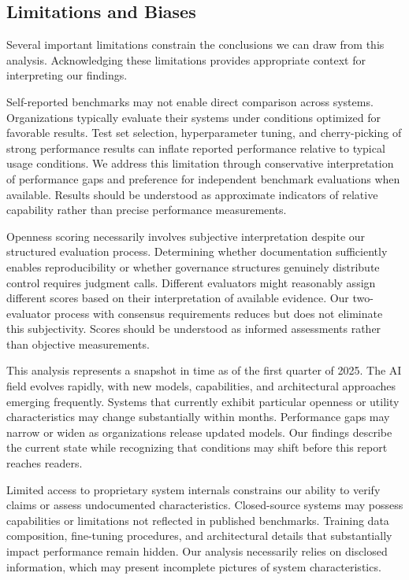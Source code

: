 \subsection{Limitations and Biases}

Several important limitations constrain the conclusions we can draw from this analysis. Acknowledging these limitations provides appropriate context for interpreting our findings.

Self-reported benchmarks may not enable direct comparison across systems. Organizations typically evaluate their systems under conditions optimized for favorable results. Test set selection, hyperparameter tuning, and cherry-picking of strong performance results can inflate reported performance relative to typical usage conditions. We address this limitation through conservative interpretation of performance gaps and preference for independent benchmark evaluations when available. Results should be understood as approximate indicators of relative capability rather than precise performance measurements.

Openness scoring necessarily involves subjective interpretation despite our structured evaluation process. Determining whether documentation sufficiently enables reproducibility or whether governance structures genuinely distribute control requires judgment calls. Different evaluators might reasonably assign different scores based on their interpretation of available evidence. Our two-evaluator process with consensus requirements reduces but does not eliminate this subjectivity. Scores should be understood as informed assessments rather than objective measurements.

This analysis represents a snapshot in time as of the first quarter of 2025. The AI field evolves rapidly, with new models, capabilities, and architectural approaches emerging frequently. Systems that currently exhibit particular openness or utility characteristics may change substantially within months. Performance gaps may narrow or widen as organizations release updated models. Our findings describe the current state while recognizing that conditions may shift before this report reaches readers.

Limited access to proprietary system internals constrains our ability to verify claims or assess undocumented characteristics. Closed-source systems may possess capabilities or limitations not reflected in published benchmarks. Training data composition, fine-tuning procedures, and architectural details that substantially impact performance remain hidden. Our analysis necessarily relies on disclosed information, which may present incomplete pictures of system characteristics.


